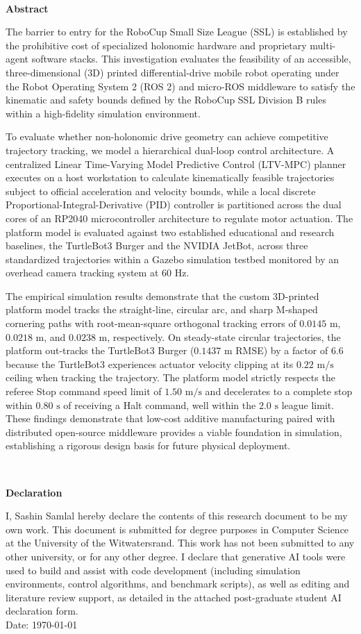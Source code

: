 \documentclass[a4paper,twoside,12pt]{report}
\renewenvironment{abstract}{\ \vfill\begin{center}\textbf{Abstract}\end{center}\addcontentsline{toc}{section}{Abstract}}{\vfill\vfill\newpage}
\newenvironment{declaration}{\ \vfill\begin{center}\textbf{Declaration}\end{center}\addcontentsline{toc}{section}{Declaration}}{\vfill\vfill\newpage}
\begin{document}
\begin{abstract} 
The barrier to entry for the RoboCup Small Size League (SSL) is established by the prohibitive cost of specialized holonomic hardware and proprietary multi-agent software stacks. This investigation evaluates the feasibility of an accessible, three-dimensional (3D) printed differential-drive mobile robot operating under the Robot Operating System 2 (ROS 2) and micro-ROS middleware to satisfy the kinematic and safety bounds defined by the RoboCup SSL Division B rules within a high-fidelity simulation environment.

To evaluate whether non-holonomic drive geometry can achieve competitive trajectory tracking, we model a hierarchical dual-loop control architecture. A centralized Linear Time-Varying Model Predictive Control (LTV-MPC) planner executes on a host workstation to calculate kinematically feasible trajectories subject to official acceleration and velocity bounds, while a local discrete Proportional-Integral-Derivative (PID) controller is partitioned across the dual cores of an RP2040 microcontroller architecture to regulate motor actuation. The platform model is evaluated against two established educational and research baselines, the TurtleBot3 Burger and the NVIDIA JetBot, across three standardized trajectories within a Gazebo simulation testbed monitored by an overhead camera tracking system at $60\text{ Hz}$.

The empirical simulation results demonstrate that the custom 3D-printed platform model tracks the straight-line, circular arc, and sharp M-shaped cornering paths with root-mean-square orthogonal tracking errors of $0.0145\text{ m}$, $0.0218\text{ m}$, and $0.0238\text{ m}$, respectively. On steady-state circular trajectories, the platform out-tracks the TurtleBot3 Burger ($0.1437\text{ m}$ RMSE) by a factor of 6.6 because the TurtleBot3 experiences actuator velocity clipping at its $0.22\text{ m/s}$ ceiling when tracking the trajectory. The platform model strictly respects the referee Stop command speed limit of $1.50\text{ m/s}$ and decelerates to a complete stop within $0.80\text{ s}$ of receiving a Halt command, well within the $2.0\text{ s}$ league limit. These findings demonstrate that low-cost additive manufacturing paired with distributed open-source middleware provides a viable foundation in simulation, establishing a rigorous design basis for future physical deployment.
\end{abstract}

\begin{declaration}
I, Sashin Samlal hereby declare the contents of this research document to be my own work. This document is submitted for degree purposes in Computer Science at the University of the Witwatersrand. 
This work has not been submitted to any other university, or for any other degree. I declare that generative AI tools were used to build and assist with code development (including simulation environments, control algorithms, and benchmark scripts), as well as editing and literature review support, as detailed in the attached post-graduate student AI declaration form.\\
Date: \today
\end{declaration}
\end{document}
